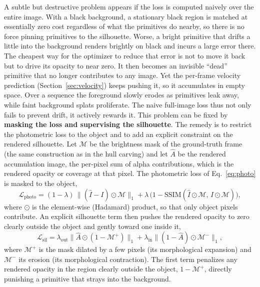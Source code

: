 A subtle but destructive problem appears if the loss is
computed naively over the entire image. With a black background, a stationary black
region is matched at essentially zero cost regardless of what the primitives do
nearby, so there is no force pinning primitives to the silhouette. Worse, a
bright primitive that drifts a little into the background renders brightly on black
and incurs a large error there. The cheapest way for the optimizer to reduce that
error is not to move it back but to drive its opacity to near zero. It then becomes an
invisible \enquote{dead} primitive that no longer contributes to any image. Yet the
per-frame velocity prediction (Section~\ref{sec:velocity}) keeps pushing it, so it
accumulates in empty space. Over a sequence the foreground slowly erodes as primitives
leak away, while faint background splats proliferate. The naive full-image loss thus
not only fails to prevent drift, it actively rewards it. This problem can be fixed by \textbf{masking the loss and supervising the silhouette}. The remedy is to
restrict the photometric loss to the object and to add an explicit constraint on the
rendered silhouette. Let $\mathcal{M}$ be the brightness mask of the ground-truth
frame (the same construction as in the hull carving) and let $\hat A$ be the rendered
accumulation image, the per-pixel sum of alpha contributions, which is the
rendered opacity or coverage at that pixel. The photometric loss of
Eq.~\eqref{eq:photo} is masked to the object,
\begin{equation}
    \mathcal{L}_{\text{photo}} = (1-\lambda)\,\big\| (\hat I - I)\odot \mathcal{M} \big\|_1
    + \lambda\,\big(1 - \mathrm{SSIM}(\hat I \odot \mathcal{M},\, I \odot \mathcal{M})\big),
\end{equation}
where $\odot$ is the element-wise (Hadamard) product, so that only object pixels
contribute. An explicit silhouette term then pushes the rendered opacity to zero
clearly outside the object and gently toward one inside it,
\begin{equation}
    \mathcal{L}_{\text{sil}}
    = \lambda_{\text{out}} \big\| \hat A \odot (1 - \mathcal{M}^{+}) \big\|_1
    + \lambda_{\text{in}} \big\| (1 - \hat A) \odot \mathcal{M}^{-} \big\|_1 ,
    \label{eq:sil}
\end{equation}
where $\mathcal{M}^{+}$ is the mask dilated by a few pixels (its morphological
expansion) and $\mathcal{M}^{-}$ its erosion (its morphological contraction). The
first term penalizes any rendered opacity in the region clearly outside the object,
$1 - \mathcal{M}^{+}$, directly punishing a primitive that strays into the background.
